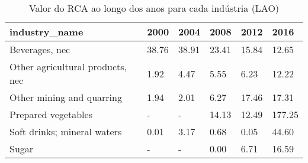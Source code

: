 \begin{table}
\centering
\caption{Valor do RCA ao longo dos anos para cada indústria (LAO)}
\begin{tabular}{p{6cm}p{1.5cm}p{1.5cm}p{1.5cm}p{1.5cm}p{1.5cm}}
\toprule
                   industry\_name &  2000 &  2004 &  2008 &  2012 &   2016 \\
\midrule
                  Beverages, nec & 38.76 & 38.91 & 23.41 & 15.84 &  12.65 \\
Other agricultural products, nec &  1.92 &  4.47 &  5.55 &  6.23 &  12.22 \\
       Other mining and quarring &  1.94 &  2.01 &  6.27 & 17.46 &  17.31 \\
             Prepared vegetables &     - &     - & 14.13 & 12.49 & 177.25 \\
     Soft drinks; mineral waters &  0.01 &  3.17 &  0.68 &  0.05 &  44.60 \\
                           Sugar &     - &     - &  0.00 &  6.71 &  16.59 \\
\bottomrule
\end{tabular}
\end{table}
